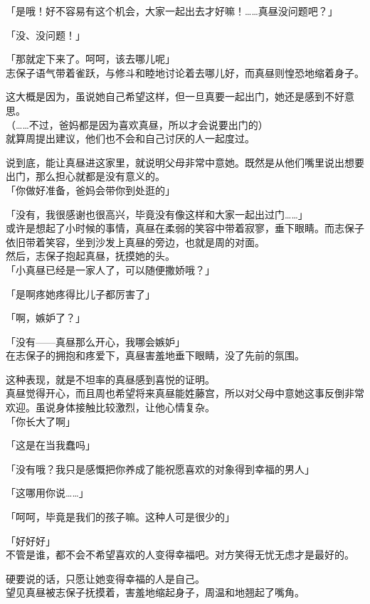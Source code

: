 「是哦！好不容易有这个机会，大家一起出去才好嘛！……真昼没问题吧？」

「没、没问题！」

「那就定下来了。呵呵，该去哪儿呢」\\

志保子语气带着雀跃，与修斗和睦地讨论着去哪儿好，而真昼则惶恐地缩着身子。

这大概是因为，虽说她自己希望这样，但一旦真要一起出门，她还是感到不好意思。\\

（……不过，爸妈都是因为喜欢真昼，所以才会说要出门的）\\

就算周提出建议，他们也不会和自己讨厌的人一起度过。

说到底，能让真昼进这家里，就说明父母非常中意她。既然是从他们嘴里说出想要出门，那么担心就都是没有意义的。\\

「你做好准备，爸妈会带你到处逛的」

「没有，我很感谢也很高兴，毕竟没有像这样和大家一起出过门……」\\

或许是想起了小时候的事情，真昼在柔弱的笑容中带着寂寥，垂下眼睛。而志保子依旧带着笑容，坐到沙发上真昼的旁边，也就是周的对面。\\

然后，志保子抱起真昼，抚摸她的头。\\

「小真昼已经是一家人了，可以随便撒娇哦？」

「是啊疼她疼得比儿子都厉害了」

「啊，嫉妒了？」

「没有——真昼那么开心，我哪会嫉妒」\\

在志保子的拥抱和疼爱下，真昼害羞地垂下眼睛，没了先前的氛围。

这种表现，就是不坦率的真昼感到喜悦的证明。\\

真昼觉得开心，而且周也希望将来真昼能姓藤宫，所以对父母中意她这事反倒非常欢迎。虽说身体接触比较激烈，让他心情复杂。\\

「你长大了啊」

「这是在当我蠢吗」

「没有哦？我只是感慨把你养成了能祝愿喜欢的对象得到幸福的男人」

「这哪用你说……」

「呵呵，毕竟是我们的孩子嘛。这种人可是很少的」

「好好好」\\

不管是谁，都不会不希望喜欢的人变得幸福吧。对方笑得无忧无虑才是最好的。

硬要说的话，只愿让她变得幸福的人是自己。\\

望见真昼被志保子抚摸着，害羞地缩起身子，周温和地翘起了嘴角。
